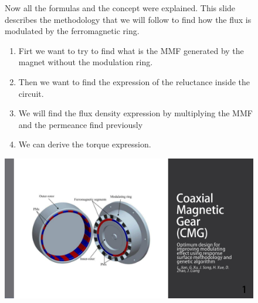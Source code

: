 \begin{figure}[H]
    \begin{minipage}{.45\linewidth}
        Now all the formulas and the concept were explained. This slide describes the methodology that we will follow to find how the flux is modulated by the ferromagnetic ring. 
        
        \begin{enumerate}
            \item Firt we want to try to find what is the MMF generated by the magnet without the modulation ring.
            \item Then we want to find the expression of the reluctance inside the circuit.
            \item We will find the flux density expression by multiplying the MMF and the permeance find previously
            \item We can derive the torque expression.
        \end{enumerate}
        
    \end{minipage}
    \hfill%
    \begin{minipage}[c]{.45\linewidth}
        \centering
        \includegraphics[page={16},width=\textwidth]{LELEC2311.allow.pdf}
    \end{minipage}
\end{figure}

